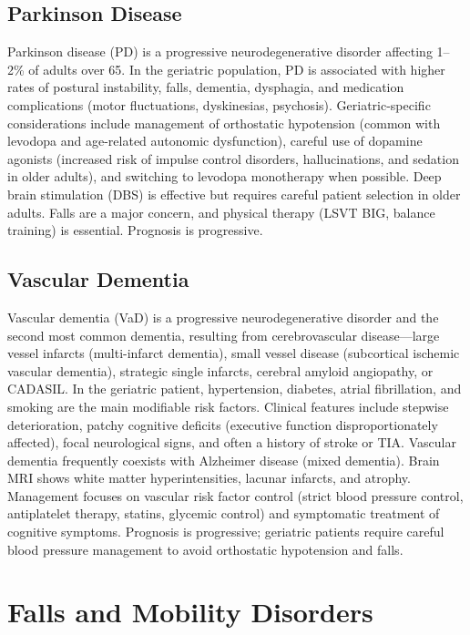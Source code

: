 \subsection{Parkinson Disease}
\label{sec:Parkinson Disease}
Parkinson disease (PD) is a progressive neurodegenerative disorder affecting 1--2\% of adults over 65. In the geriatric population, PD is associated with higher rates of postural instability, falls, dementia, dysphagia, and medication complications (motor fluctuations, dyskinesias, psychosis). Geriatric-specific considerations include management of orthostatic hypotension (common with levodopa and age-related autonomic dysfunction), careful use of dopamine agonists (increased risk of impulse control disorders, hallucinations, and sedation in older adults), and switching to levodopa monotherapy when possible. Deep brain stimulation (DBS) is effective but requires careful patient selection in older adults. Falls are a major concern, and physical therapy (LSVT BIG, balance training) is essential. Prognosis is progressive.

\subsection{Vascular Dementia}
\label{sec:Vascular Dementia}
Vascular dementia (VaD) is a progressive neurodegenerative disorder and the second most common dementia, resulting from cerebrovascular disease---large vessel infarcts (multi-infarct dementia), small vessel disease (subcortical ischemic vascular dementia), strategic single infarcts, cerebral amyloid angiopathy, or CADASIL. In the geriatric patient, hypertension, diabetes, atrial fibrillation, and smoking are the main modifiable risk factors. Clinical features include stepwise deterioration, patchy cognitive deficits (executive function disproportionately affected), focal neurological signs, and often a history of stroke or TIA. Vascular dementia frequently coexists with Alzheimer disease (mixed dementia). Brain MRI shows white matter hyperintensities, lacunar infarcts, and atrophy. Management focuses on vascular risk factor control (strict blood pressure control, antiplatelet therapy, statins, glycemic control) and symptomatic treatment of cognitive symptoms. Prognosis is progressive; geriatric patients require careful blood pressure management to avoid orthostatic hypotension and falls.

\section{Falls and Mobility Disorders}

